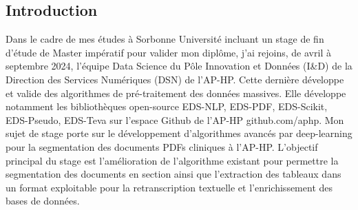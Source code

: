 \documentclass{report}
\begin{document}
\tableofcontents
\newpage
\pagenumbering{}


\begin{multicols}{2} %
    \section {Introduction} 
    Dans le cadre de mes études à Sorbonne Université incluant un stage de fin d'étude de Master impératif pour valider mon diplôme, j’ai rejoins, de avril à septembre 2024, l’équipe Data Science du Pôle Innovation et Données (I\&D) de la Direction des Services Numériques (DSN) de l’AP-HP. Cette dernière développe et valide des algorithmes de pré-traitement des données massives. Elle développe notamment les bibliothèques open-source EDS-NLP, EDS-PDF, EDS-Scikit, EDS-Pseudo, EDS-Teva sur l’espace Github de l’AP-HP github.com/aphp. 
    \hspace{0.1em} Mon sujet de stage porte sur le développement d’algorithmes avancés par deep-learning pour la segmentation des documents PDFs cliniques à l’AP-HP.
    \hspace{0.1em} L’objectif principal du stage est l’amélioration de l’algorithme existant pour permettre la segmentation des documents en section ainsi que l’extraction des tableaux dans un format exploitable pour la retranscription textuelle et l’enrichissement des bases de données.


\end{multicols}
\end{document}
